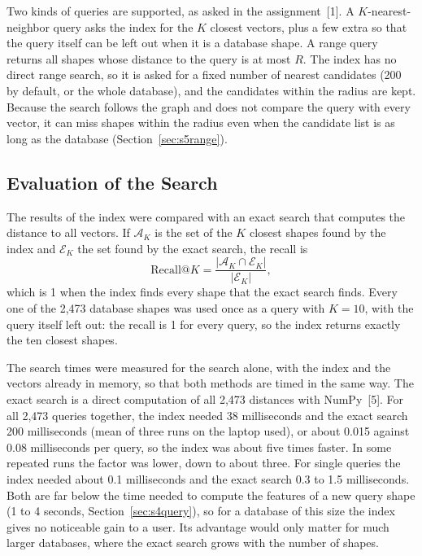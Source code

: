 \documentclass[10pt,a4paper]{article}
\newcommand{\card}[1]{\lvert #1\rvert}
\begin{document}
Two kinds of queries are supported, as asked in the assignment~[1]. A $K$-nearest-neighbor query asks the index for the $K$
closest vectors, plus a few extra so that the query itself can be left out when it is a database shape. A range query returns
all shapes whose distance to the query is at most $R$. The index has no direct range search, so it is asked for a fixed number
of nearest candidates (200 by default, or the whole database), and the candidates within the radius are kept. Because the
search follows the graph and does not compare the query with every vector, it can miss shapes within the radius even when
the candidate list is as long as the database (Section~\ref{sec:s5range}).

\subsection{Evaluation of the Search}\label{sec:s5eval}
The results of the index were compared with an exact search that computes the distance to all vectors. If $\mathcal{A}_K$ is
the set of the $K$ closest shapes found by the index and $\mathcal{E}_K$ the set found by the exact search, the recall is
\begin{equation}
\mathrm{Recall}@K=\frac{\card{\mathcal{A}_K\cap\mathcal{E}_K}}{\card{\mathcal{E}_K}},
\label{eq:s5recall}
\end{equation}
which is 1 when the index finds every shape that the exact search finds. Every one of the 2,473 database shapes was used once as a
query with $K=10$, with the query itself left out: the recall is 1 for every query, so the index returns exactly the ten closest
shapes.

The search times were measured for the search alone, with the index and the vectors already in memory, so that both methods are
timed in the same way. The exact search is a direct computation of all 2,473 distances with NumPy~[5]. For all 2,473 queries
together, the index needed 38 milliseconds and the exact search 200 milliseconds (mean of three runs on the laptop used), or
about 0.015 against 0.08 milliseconds per query, so the index was about five times faster. In some repeated runs the factor was
lower, down to about three. For single
queries the index needed about 0.1 milliseconds and the exact search 0.3 to 1.5 milliseconds. Both are far below the time needed
to compute the features of a new query shape (1 to 4 seconds, Section~\ref{sec:s4query}), so for a database of this size the
index gives no noticeable gain to a user. Its advantage would only matter for much larger databases, where the exact search grows
with the number of shapes.
\end{document}
